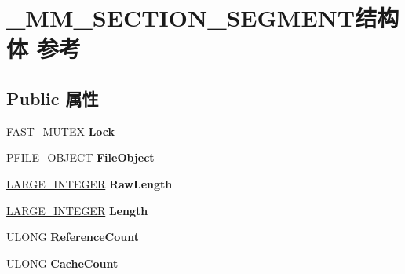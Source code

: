 \hypertarget{struct___m_m___s_e_c_t_i_o_n___s_e_g_m_e_n_t}{}\section{\+\_\+\+M\+M\+\_\+\+S\+E\+C\+T\+I\+O\+N\+\_\+\+S\+E\+G\+M\+E\+N\+T结构体 参考}
\label{struct___m_m___s_e_c_t_i_o_n___s_e_g_m_e_n_t}
\subsection*{Public 属性}
\begin{DoxyCompactItemize}
\item 
\mbox{\label{struct___m_m___s_e_c_t_i_o_n___s_e_g_m_e_n_t_a9c9bcf99a178fa7a5ec5783c34c54f45}} 
F\+A\+S\+T\+\_\+\+M\+U\+T\+EX {\bfseries Lock}
\item 
\mbox{\label{struct___m_m___s_e_c_t_i_o_n___s_e_g_m_e_n_t_a9cc87d98c9f6adbde5eae6649dbae644}} 
P\+F\+I\+L\+E\+\_\+\+O\+B\+J\+E\+CT {\bfseries File\+Object}
\item 
\mbox{\label{struct___m_m___s_e_c_t_i_o_n___s_e_g_m_e_n_t_a261137d162076d1fd1f17b8022976562}} 
\hyperlink{union___l_a_r_g_e___i_n_t_e_g_e_r}{L\+A\+R\+G\+E\+\_\+\+I\+N\+T\+E\+G\+ER} {\bfseries Raw\+Length}
\item 
\mbox{\label{struct___m_m___s_e_c_t_i_o_n___s_e_g_m_e_n_t_af87b1edbbcb754924316d5edc7c9a8e0}} 
\hyperlink{union___l_a_r_g_e___i_n_t_e_g_e_r}{L\+A\+R\+G\+E\+\_\+\+I\+N\+T\+E\+G\+ER} {\bfseries Length}
\item 
\mbox{\label{struct___m_m___s_e_c_t_i_o_n___s_e_g_m_e_n_t_afd07efdde5a3687c5466f228bff23af2}} 
U\+L\+O\+NG {\bfseries Reference\+Count}
\item 
\mbox{\label{struct___m_m___s_e_c_t_i_o_n___s_e_g_m_e_n_t_a22e83ff4ebef8869ec445f8e9cd8b541}} 
U\+L\+O\+NG {\bfseries Cache\+Count}
\item 

\end{DoxyCompactItemize}
